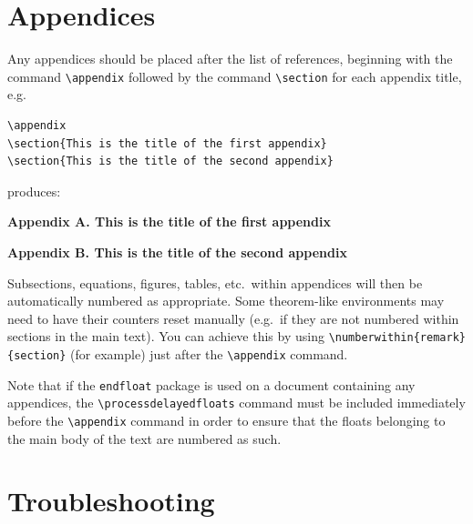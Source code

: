 \documentclass[]{interact}
\theoremstyle{plain}%
\theoremstyle{definition}
\theoremstyle{remark}
\begin{document}
\section{Appendices}

Any appendices should be placed after the list of references, beginning with the command \verb"\appendix" followed by the command \verb"\section" for each appendix title, e.g.
\begin{verbatim}
\appendix
\section{This is the title of the first appendix}
\section{This is the title of the second appendix}
\end{verbatim}
produces:\medskip

\noindent\textbf{Appendix A. This is the title of the first appendix}\medskip

\noindent\textbf{Appendix B. This is the title of the second appendix}\medskip

\noindent Subsections, equations, figures, tables, etc.\ within appendices will then be automatically numbered as appropriate. Some theorem-like environments may need to have their counters reset manually (e.g.\ if they are not numbered within sections in the main text). You can achieve this by using \verb"\numberwithin{remark}{section}" (for example) just after the \verb"\appendix" command.

Note that if the \verb"endfloat" package is used on a document containing any appendices, the \verb"\processdelayedfloats" command must be included immediately before the \verb"\appendix" command in order to ensure that the floats belonging to the main body of the text are numbered as such.


\appendix

\section{Troubleshooting}
\end{document}
